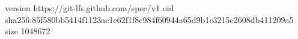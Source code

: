 version https://git-lfs.github.com/spec/v1
oid sha256:85f580bb5414f1123ac1e62f1f8c984f60944a65d9b1c3215e2608db411209a5
size 1048672
